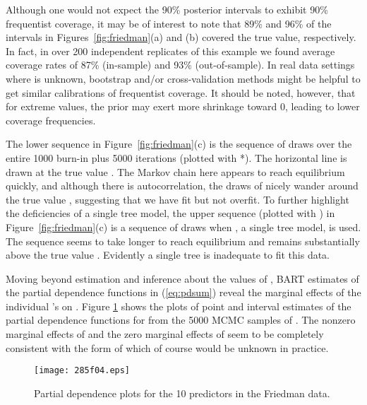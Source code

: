 \documentclass[aoas,nameyear,dvips]{arximspdf}
\begin{document}
Although one would not expect the 90\% posterior intervals to exhibit
90\% frequentist coverage, it may be of interest to note that 89\%
and 96\% of the intervals in Figures~\ref{fig:friedman}(a) and (b)
covered the true  value, respectively.   In fact, in over
200 independent replicates of this example we found average
coverage rates of  87\% (in-sample) and 93\% (out-of-sample).
In real data settings where  is unknown,
bootstrap and/or cross-validation methods might be helpful to get similar
calibrations of frequentist coverage. It should be
noted, however, that for extreme  values, the prior may exert more shrinkage toward 0, leading
to lower coverage frequencies.


The lower sequence in Figure~\ref{fig:friedman}(c) is the sequence
of  draws over the entire 1000 burn-in plus 5000
iterations (plotted with *). The horizontal line is drawn at the
true value . The Markov chain here appears to reach
equilibrium quickly, and although there is autocorrelation, the
draws of  nicely wander around the true value ,
suggesting that we have fit but not overfit.   To further
highlight the deficiencies of a single tree model, the upper
sequence (plotted with ) in Figure~\ref{fig:friedman}(c) is
a sequence of  draws when , a single tree model, is used.  The sequence
seems to take longer to reach equilibrium and remains
substantially above the true value .  Evidently a
single tree is inadequate to fit this data.

Moving beyond estimation and inference about the values of , BART
estimates of the partial dependence functions  in
(\ref{eq:pdsum}) reveal the marginal effects of the individual 's
on . Figure \ref{fig:friedman-pdplot} shows the plots of point and
interval estimates of the partial dependence functions for
  from the 5000 MCMC samples of .  The nonzero
marginal effects of  and the zero marginal effects of
 seem to be completely consistent with the form of
 which of course would be unknown in practice.

\begin{figure}[b]

\texttt{[image: 285f04.eps]}

\caption{Partial dependence plots for the 10 predictors in the Friedman data.}\label{fig:friedman-pdplot}
\end{figure}
\end{document}
